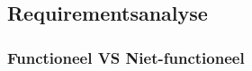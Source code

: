 
\chapter{}
\label{ch:methodologie}



\section{Requirementsanalyse}

\subsection{Functioneel VS Niet-functioneel}

